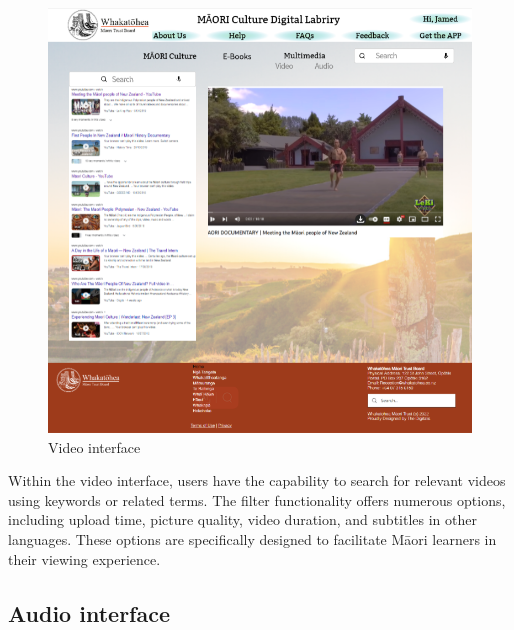 \begin{figure}[htbp]
  \centerline{\includegraphics[width=400pt]{images/3-3-1.png}}
  \caption{Video interface}
  \label{fig30}
\end{figure}

Within the video interface, users have the capability to search for relevant videos using keywords or related terms. The filter functionality offers numerous options, including upload time, picture quality, video duration, and subtitles in other languages. These options are specifically designed to facilitate Māori learners in their viewing experience.
\subsection{Audio interface}

